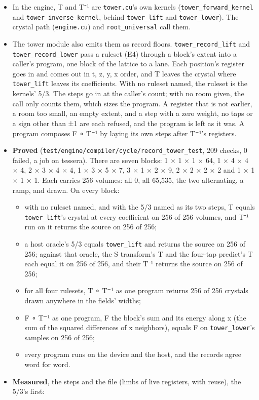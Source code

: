 \begin{itemize}
\begin{itemize}
\begin{itemize}
\item In the engine, T and T⁻¹ are \texttt{tower.\allowbreak{}cu}'s own kernels (\texttt{tower\_\allowbreak{}forward\_\allowbreak{}kernel} and \texttt{tower\_\allowbreak{}inverse\_\allowbreak{}kernel}, behind \texttt{tower\_\allowbreak{}lift} and \texttt{tower\_\allowbreak{}lower}). The crystal path (\texttt{engine.\allowbreak{}cu}) and \texttt{root\_\allowbreak{}universal} call them.
\item The tower module also emits them as record floors. \texttt{tower\_\allowbreak{}record\_\allowbreak{}lift} and \texttt{tower\_\allowbreak{}record\_\allowbreak{}lower} pass a ruleset (E4) through a block's extent into a caller's program, one block of the lattice to a lane. Each position's register goes in and comes out in t, z, y, x order, and T leaves the crystal where \texttt{tower\_\allowbreak{}lift} leaves its coefficients. With no ruleset named, the ruleset is the kernels' 5/3. The steps go in at the caller's count; with no room given, the call only counts them, which sizes the program. A register that is not earlier, a room too small, an empty extent, and a step with a zero weight, no taps or a sign other than ±1 are each refused, and the program is left as it was. A program composes F ∘ T⁻¹ by laying its own steps after T⁻¹'s registers.
\item \textbf{Proved} (\texttt{test/\allowbreak{}engine/\allowbreak{}compiler/\allowbreak{}cycle/\allowbreak{}record\_\allowbreak{}tower\_\allowbreak{}test}, 209 checks, 0 failed, a job on tessera). There are seven blocks: 1 × 1 × 1 × 64, 1 × 4 × 4 × 4, 2 × 3 × 4 × 4, 1 × 3 × 5 × 7, 3 × 1 × 2 × 9, 2 × 2 × 2 × 2 and 1 × 1 × 1 × 1. Each carries 256 volumes: all 0, all 65,535, the two alternating, a ramp, and drawn. On every block:

\begin{itemize}
\item with no ruleset named, and with the 5/3 named as its two steps, T equals \texttt{tower\_\allowbreak{}lift}'s crystal at every coefficient on 256 of 256 volumes, and T⁻¹ run on it returns the source on 256 of 256;
\item a host oracle's 5/3 equals \texttt{tower\_\allowbreak{}lift} and returns the source on 256 of 256; against that oracle, the S transform's T and the four-tap predict's T each equal it on 256 of 256, and their T⁻¹ returns the source on 256 of 256;
\item for all four rulesets, T ∘ T⁻¹ as one program returns 256 of 256 crystals drawn anywhere in the fields' widths;
\item F ∘ T⁻¹ as one program, F the block's sum and its energy along x (the sum of the squared differences of x neighbors), equals F on \texttt{tower\_\allowbreak{}lower}'s samples on 256 of 256;
\item every program runs on the device and the host, and the records agree word for word.
\end{itemize}
\item \textbf{Measured}, the steps and the file (limbs of live registers, with reuse), the 5/3's first:


\end{itemize}
\end{itemize}
\end{itemize}

